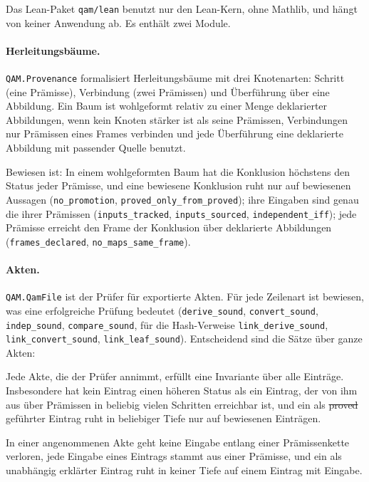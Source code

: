 Das Lean-Paket \texttt{qam/lean} benutzt nur den Lean-Kern, ohne Mathlib, und hängt von keiner Anwendung ab. Es enthält zwei Module.

\paragraph{Herleitungsbäume.} \texttt{QAM.Provenance} formalisiert Herleitungsbäume mit drei Knotenarten: Schritt (eine Prämisse),
Verbindung (zwei Prämissen) und Überführung über eine Abbildung. Ein Baum ist wohlgeformt relativ zu einer Menge deklarierter Abbildungen,
wenn kein Knoten stärker ist als seine Prämissen, Verbindungen nur Prämissen eines Frames verbinden und jede Überführung eine deklarierte
Abbildung mit passender Quelle benutzt.

Bewiesen ist: In einem wohlgeformten Baum hat die Konklusion höchstens den Status jeder Prämisse, und eine bewiesene Konklusion ruht nur
auf bewiesenen Aussagen (\texttt{no\_promotion}, \texttt{proved\_only\_from\_proved}); ihre Eingaben sind genau die ihrer Prämissen
(\texttt{inputs\_tracked}, \texttt{inputs\_sourced}, \texttt{independent\_iff}); jede Prämisse erreicht den Frame der Konklusion über
deklarierte Abbildungen (\texttt{frames\_declared}, \texttt{no\_maps\_same\_frame}).

\paragraph{Akten.} \texttt{QAM.QamFile} ist der Prüfer für exportierte Akten. Für jede Zeilenart ist bewiesen, was eine erfolgreiche Prüfung
bedeutet (\texttt{derive\_sound}, \texttt{convert\_sound}, \texttt{indep\_sound}, \texttt{compare\_sound}, für die Hash-Verweise
\texttt{link\_derive\_sound}, \texttt{link\_convert\_sound}, \texttt{link\_leaf\_sound}). Entscheidend sind die Sätze über ganze Akten:

\begin{satz}
Jede Akte, die der Prüfer annimmt, erfüllt eine Invariante über alle Einträge. Insbesondere hat kein Eintrag einen höheren Status als ein
Eintrag, der von ihm aus über Prämissen in beliebig vielen Schritten erreichbar ist, und ein als \st{proved} geführter Eintrag ruht in
beliebiger Tiefe nur auf bewiesenen Einträgen.
\end{satz}

\begin{satz}
In einer angenommenen Akte geht keine Eingabe entlang einer Prämissenkette verloren, jede Eingabe eines Eintrags stammt aus einer Prämisse,
und ein als unabhängig erklärter Eintrag ruht in keiner Tiefe auf einem Eintrag mit Eingabe.
\end{satz}

